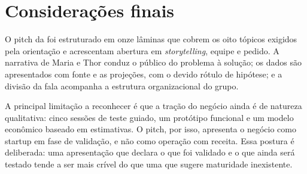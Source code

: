 \section{Considerações finais}
\label{sec:consideracoes}

O pitch da \projeto{} foi estruturado em onze lâminas que cobrem os oito tópicos exigidos pela orientação e acrescentam abertura em \textit{storytelling}, equipe e pedido. A narrativa de Maria e Thor conduz o público do problema à solução; os dados são apresentados com fonte e as projeções, com o devido rótulo de hipótese; e a divisão da fala acompanha a estrutura organizacional do grupo.

A principal limitação a reconhecer é que a tração do negócio ainda é de natureza qualitativa: cinco sessões de teste guiado, um protótipo funcional e um modelo econômico baseado em estimativas. O pitch, por isso, apresenta o negócio como startup em fase de validação, e não como operação com receita. Essa postura é deliberada: uma apresentação que declara o que foi validado e o que ainda será testado tende a ser mais crível do que uma que sugere maturidade inexistente.

